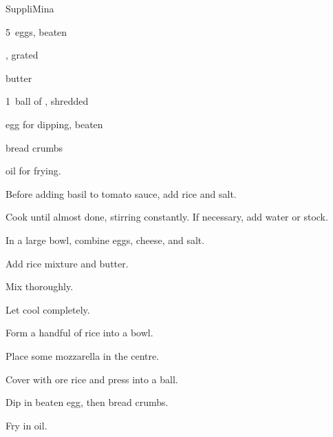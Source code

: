 \begin{recipe}{Suppli}{Mina}{}

\begin{ingredients}
\item {} 
\item 5~eggs, beaten
\item {}, grated
\item \C{\quarter} butter
\item {}
\item 1~ball of , shredded
\item egg for dipping, beaten
\item bread crumbs
\item oil for frying.
\end{ingredients}

\begin{directions}
\item Before adding basil to tomato sauce, add rice and salt.
\item Cook until almost done, stirring constantly. If necessary, add water or stock.
\item In a large bowl, combine eggs, cheese, and salt.
\item Add rice mixture and butter.
\item Mix thoroughly.
\item Let cool completely.
\item Form a handful of rice into a bowl.
\item Place some mozzarella in the centre.
\item Cover with ore rice and press into a ball.
\item Dip in beaten egg, then bread crumbs.
\item Fry in oil.
\end{directions}

\end{recipe}
